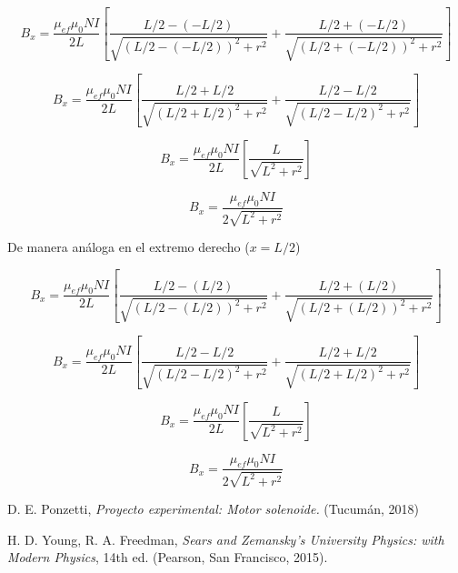 \documentclass[a4paper,12pt]{article}
\begin{document}
    \begin{equation*}
        B_x = \frac{\mu_{ef}\mu_0 N I}{2L} \left[ \frac{L/2 - (-L/2)}{\sqrt{(L/2 - (-L/2))^2 + r^2}} + \frac{L/2 + (-L/2)}{\sqrt{(L/2 + (-L/2))^2 + r^2}} \right]
    \end{equation*}

    \begin{equation*}
        B_x = \frac{\mu_{ef}\mu_0 N I}{2L} \left[ \frac{L/2 + L/2}{\sqrt{(L/2 + L/2)^2 + r^2}} + \frac{L/2 - L/2}{\sqrt{(L/2 - L/2)^2 + r^2}} \right]
    \end{equation*}

    \begin{equation*}
        B_x = \frac{\mu_{ef}\mu_0 N I}{2L} \left[ \frac{L}{\sqrt{L^2 + r^2}} \right]
    \end{equation*}

    \begin{equation*}
        B_x = \frac{\mu_{ef}\mu_0 N I}{2\sqrt{L^2 + r^2}}
    \end{equation*}

De manera análoga en el extremo derecho ($x=L/2$)

    \begin{equation*}
        B_x = \frac{\mu_{ef}\mu_0 N I}{2L} \left[ \frac{L/2 - (L/2)}{\sqrt{(L/2 - (L/2))^2 + r^2}} + \frac{L/2 + (L/2)}{\sqrt{(L/2 + (L/2))^2 + r^2}} \right]
    \end{equation*}

    \begin{equation*}
        B_x = \frac{\mu_{ef}\mu_0 N I}{2L} \left[ \frac{L/2 - L/2}{\sqrt{(L/2 - L/2)^2 + r^2}} + \frac{L/2 + L/2}{\sqrt{(L/2 + L/2)^2 + r^2}} \right]
    \end{equation*}

    \begin{equation*}
        B_x = \frac{\mu_{ef}\mu_0 N I}{2L} \left[ \frac{L}{\sqrt{L^2 + r^2}} \right]
    \end{equation*}
    
    \begin{equation*}
        B_x = \frac{\mu_{ef}\mu_0 N I}{2\sqrt{L^2 + r^2}}
    \end{equation*}

\begin{thebibliography}{99}

    \bibitem{} D. E. Ponzetti, \emph{Proyecto experimental: Motor solenoide.} (Tucumán, 2018)

    \bibitem{} H. D. Young, R. A. Freedman, \emph{Sears and Zemansky's University Physics: with Modern Physics}, 14th ed. (Pearson, San Francisco, 2015).

\end{thebibliography}
\end{document}
